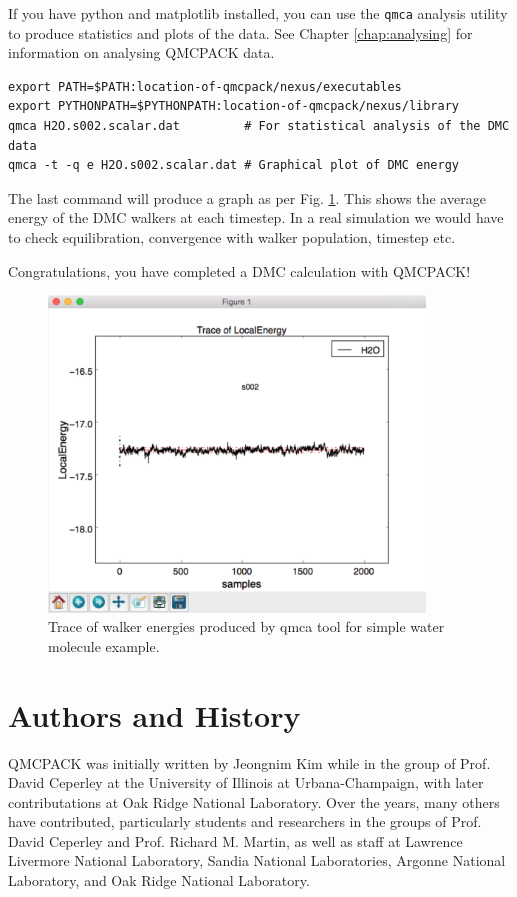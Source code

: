 If you have python and matplotlib installed, you can use the
\texttt{qmca} analysis utility to produce statistics and plots of the
data. See Chapter \ref{chap:analysing} for information on analysing
QMCPACK data.
\begin{verbatim}
export PATH=$PATH:location-of-qmcpack/nexus/executables 
export PYTHONPATH=$PYTHONPATH:location-of-qmcpack/nexus/library
qmca H2O.s002.scalar.dat         # For statistical analysis of the DMC data
qmca -t -q e H2O.s002.scalar.dat # Graphical plot of DMC energy
\end{verbatim}

The last command will produce a graph as per
Fig. \ref{fig:quick_qmca_dmc_trace}. This shows the average energy of
the DMC walkers at each timestep. In a real simulation we would have
to check equilibration, convergence with walker population, timestep etc.

Congratulations, you have completed a DMC calculation with QMCPACK!

\begin{figure}
  \centering
  \includegraphics[width=10cm]{figures/quick_qmca_dmc_trace.png}
  \caption{Trace of walker energies produced by qmca tool for simple
    water molecule example.}
  \label{fig:quick_qmca_dmc_trace}
\end{figure}

\section{Authors and History}
\label{sec:history}
QMCPACK was initially written by Jeongnim Kim while in the group of
Prof. David Ceperley at the University of Illinois at
Urbana-Champaign, with later contributations at Oak Ridge National Laboratory. Over the years, many others have contributed, particularly
students and researchers in the groups of Prof. David Ceperley
and Prof. Richard M. Martin, as well as staff at Lawrence Livermore
National Laboratory, Sandia National Laboratories, Argonne National
Laboratory, and Oak Ridge National Laboratory.

